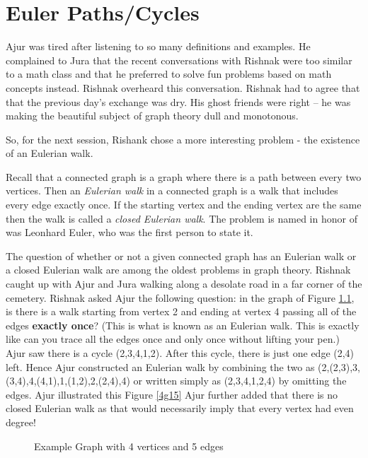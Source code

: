 \chapter{Euler Paths/Cycles}

Ajur was tired after listening to so many definitions and examples. He complained to Jura that the recent conversations with Rishnak were too similar to a math class and that he preferred to solve fun problems based on math concepts instead.  Rishnak overheard this conversation. Rishnak had to agree that that the previous day's exchange was dry. His ghost friends were right -- he was making the beautiful subject of graph theory dull and monotonous.

So, for the next session, Rishank chose a more interesting problem - the existence of an Eulerian walk. 

Recall that a connected graph is a graph where there is a path between every two vertices. Then an \emph{Eulerian walk} in a connected graph is a walk that includes every edge exactly once. If the starting vertex and the ending vertex are the same then the walk is called a \emph{closed Eulerian walk}. The problem is named in honor of was Leonhard Euler, who was the first person to state it.

The question of whether or not a given connected graph has an Eulerian walk or a closed Eulerian walk are among the oldest problems in graph theory. Rishnak caught up with Ajur and Jura walking along a desolate road in a far corner of the cemetery. Rishnak asked Ajur the following question: in the graph of Figure \ref{4g1}, is there is a walk starting from vertex 2 and ending at vertex 4 passing all of the edges \textbf{exactly once}? (This is what is known as an Eulerian walk. This is exactly like can you trace all the edges once and only once without lifting your pen.) Ajur saw there is a cycle (2,3,4,1,2). After this cycle, there is just one edge (2,4) left. Hence Ajur constructed an Eulerian walk by combining the two as (2,(2,3),3,(3,4),4,(4,1),1,(1,2),2,(2,4),4) or written simply as (2,3,4,1,2,4) by omitting the edges. Ajur illustrated this Figure \ref{4g15} Ajur further added that there is no closed Eulerian walk as that would necessarily imply that every vertex had even degree!


\begin{figure}
\begin{center}
\caption{ Example Graph with 4 vertices and 5 edges}\label{4g1}
\end{center}
\end{figure}

